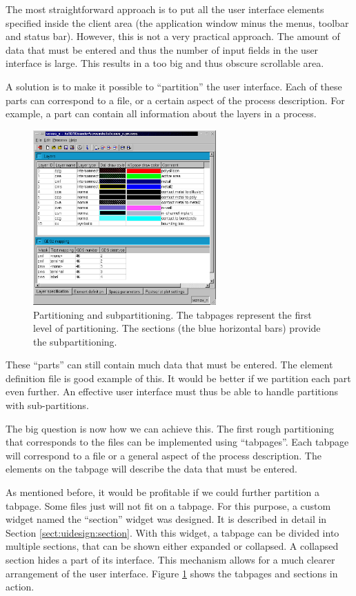 The most straightforward approach is to put all the user interface elements
specified inside the client area (the application window minus the menus,
toolbar and status bar). However, this is not a very practical approach. The
amount of data that must be entered and thus the number of input fields in the
user interface is large. This results in a too big and thus obscure scrollable
area.

\bigskip \noindent
A solution is to make it possible to ``partition'' the user interface. Each of
these parts can correspond to a file, or a certain aspect of the process
description. For example, a part can contain all information about the layers
in a process.

\begin{figure}[h!] \begin{center}
\includegraphics[width=7cm]{./figures/partition.eps}%
\caption{Partitioning and subpartitioning. The tabpages represent the first
level of partitioning. The sections (the blue horizontal bars) provide the
subpartitioning.}
\label{fig:design:tabpages}
\end{center} \end{figure}


These ``parts'' can still contain much data that must be entered. The element
definition file is good example of this. It would be better if we partition
each part even further. An effective user interface must thus be able to handle
partitions with sub-partitions.

\bigskip \noindent
The big question is now how we can achieve this. The first rough partitioning
that corresponds to the files can be implemented using ``tabpages''. Each
tabpage will correspond to a file or a general aspect of the process
description. The elements on the tabpage will describe the data that must be
entered.

As mentioned before, it would be profitable if we could further partition a
tabpage. Some files just will not fit on a tabpage. For this purpose, a custom
widget named the ``section'' widget was designed. It is described in detail in
Section \ref{sect:uidesign:section}. With this widget, a tabpage can be divided
into multiple sections, that can be shown either expanded or collapsed. A
collapsed section hides a part of its interface. This mechanism allows for a
much clearer arrangement of the user interface. Figure
\ref{fig:design:tabpages} shows the tabpages and sections in action.


